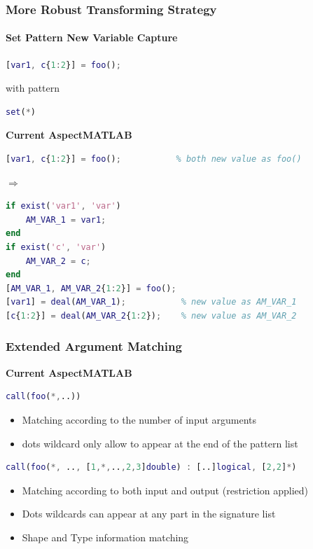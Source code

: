 \documentclass[10pt]{beamer}
\begin{document}
\begin{frame}[fragile]
\frametitle{More Robust Transforming Strategy}
\framesubtitle{Set Pattern New Variable Capture}
\begin{lstlisting}[basicstyle=\small, language=MATLAB]
[var1, c{1:2}] = foo();
\end{lstlisting}
with pattern
\begin{lstlisting}[basicstyle=\small, language=MATLAB]
set(*)
\end{lstlisting}
\textbf{Current AspectMATLAB}
\begin{lstlisting}[basicstyle=\small, language=MATLAB]
[var1, c{1:2}] = foo();           % both new value as foo()
\end{lstlisting}
$\Rightarrow$
\begin{lstlisting}[basicstyle=\small, language=MATLAB]
if exist('var1', 'var')
    AM_VAR_1 = var1;
end
if exist('c', 'var')
    AM_VAR_2 = c;
end
[AM_VAR_1, AM_VAR_2{1:2}] = foo();
[var1] = deal(AM_VAR_1);           % new value as AM_VAR_1
[c{1:2}] = deal(AM_VAR_2{1:2});    % new value as AM_VAR_2
\end{lstlisting}
\end{frame}

\begin{frame}[fragile]
\frametitle{Extended Argument Matching}
\textbf{Current AspectMATLAB}
\begin{lstlisting}[basicstyle=\small, language=MATLAB]
call(foo(*,..))
\end{lstlisting}
\begin{itemize}
    \item Matching according to the number of input arguments
    \item dots wildcard only allow to appear at the end of the pattern list
\end{itemize}

\pause

\begin{lstlisting}[basicstyle=\small, language=MATLAB]
call(foo(*, .., [1,*,..,2,3]double) : [..]logical, [2,2]*)
\end{lstlisting}
\begin{itemize}
    \item Matching according to both input and output (restriction applied)
    \item Dots wildcards can appear at any part in the signature list
    \item Shape and Type information matching
\end{itemize}    
\end{frame}
\end{document}
